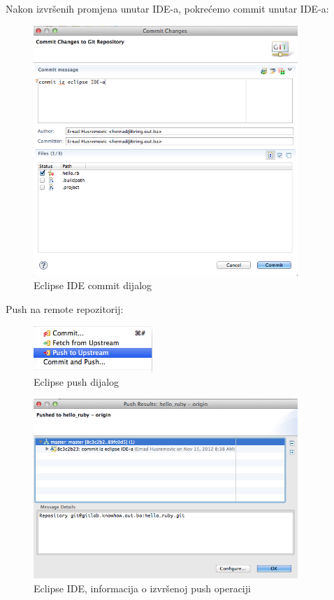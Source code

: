 \documentclass[times, utf8, seminar]{fit}
\begin{document}
\begin{itemize}
Nakon izvršenih promjena unutar IDE-a, pokrećemo commit unutar IDE-a:
\begin{figure}[H]
\centering
\includegraphics[width=10cm]{img/eclipse_git_03.png}
\caption{Eclipse IDE commit dijalog}
\end{figure}

Push na remote repozitorij:

\begin{figure}[H]
\centering
\includegraphics[width=4.5cm]{img/eclipse_git_04.png}
\caption{Eclipse push dijalog}
\end{figure}

\begin{figure}[H]
\centering
\includegraphics[width=10cm]{img/eclipse_git_05.png}
\caption{Eclipse IDE, informacija o izvršenoj push operaciji}
\end{figure}


\end{itemize}
\end{document}
